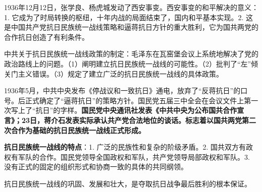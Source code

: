 {1936}年{12}月{12}日，张学良、杨虎城发动了西安事变。西安事变的和平解决的意义：1.
它成为了时局转换的枢纽，十年内战的局面结束了，国内和平基本实现。2.
这是中国共产党抗日民族统一战线策略和逼蒋抗日方针的重大胜利，它为国共两党的合作抗日创造了有利条件。{}

中共关于抗日民族统一战线政策的制定：毛泽东在瓦窑堡会议上系统地解决了党的政治路线上的问题。（1）阐明建立抗日民族统一战线的可能性。（2）批判了``左''倾关门主义错误。（3）规定了建立广泛的抗日民族统一战线的具体政策。

{1}{936}年{5}月，中共中央发布《停战议和一致抗日》通电，放弃了``反蒋抗日''的口号。后正式确定了``逼蒋抗日''的策略方针。国民党五届三中全会在会议文件上第一次写上了``抗日''的字样。\textbf{国民党中央通讯社发表《中共中央为公布国共合作宣言》；23日，蒋介石发表实际承认共产党合法地位的谈话。标志着以国共两党第二次合作为基础的抗日民族统一战线正式形成。}

\textbf{抗日民族统一战线的特点}{：}1. 广泛的民族性和复杂的阶级矛盾。2.
国共双方有政权有军队的合作。国民党领导全国政权和军队，共产党领导局部政权和军队。3.
没有正式的固定的组织形式和协商一致的具体的共同纲领{。}

抗日民族统一战线的巩固、发展和壮大，是夺取抗日战争最后胜利的根本保证{。}
